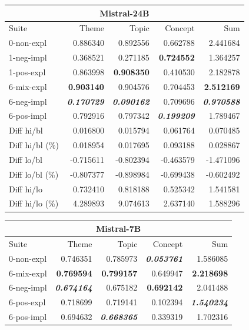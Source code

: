 \begin{table}
    \begin{tabular}{lrrrr}
    \toprule
    \multicolumn{5}{c}{\textbf{Mistral-24B}} \\
    \midrule
    Suite & Theme & Topic & Concept & Sum \\
    \midrule
    0-non-expl & 0.886340 & 0.892556 & 0.662788 & 2.441684 \\
    1-neg-impl & 0.368521 & 0.271185 & \bfseries 0.724552 & 1.364257 \\
    1-pos-expl & 0.863998 & \bfseries 0.908350 & 0.410530 & 2.182878 \\
    6-mix-expl & \bfseries 0.903140 & 0.904576 & 0.704453 & \bfseries 2.512169 \\
    6-neg-impl & \bfseries \itshape 0.170729 & \bfseries \itshape 0.090162 & 0.709696 & \bfseries \itshape 0.970588 \\
    6-pos-impl & 0.792916 & 0.797342 & \bfseries \itshape 0.199209 & 1.789467 \\
    \midrule
    Diff hi/bl & 0.016800 & 0.015794 & 0.061764 & 0.070485 \\
    Diff hi/bl (\%) & 0.018954 & 0.017695 & 0.093188 & 0.028867 \\
    \midrule
    Diff lo/bl & -0.715611 & -0.802394 & -0.463579 & -1.471096 \\
    Diff lo/bl (\%) & -0.807377 & -0.898984 & -0.699438 & -0.602492 \\
    \midrule
    Diff hi/lo & 0.732410 & 0.818188 & 0.525342 & 1.541581 \\
    Diff hi/lo (\%) & 4.289893 & 9.074613 & 2.637140 & 1.588296 \\
    \bottomrule
    \end{tabular}
    \begin{tabular}{lrrrr}
    \toprule
    \multicolumn{5}{c}{\textbf{Mistral-7B}} \\
    \midrule
    Suite & Theme & Topic & Concept & Sum \\
    \midrule
    0-non-expl & 0.746351 & 0.785973 & \bfseries \itshape 0.053761 & 1.586085 \\
    6-mix-expl & \bfseries 0.769594 & \bfseries 0.799157 & 0.649947 & \bfseries 2.218698 \\
    6-neg-impl & \bfseries \itshape 0.674164 & 0.675182 & \bfseries 0.692142 & 2.041488 \\
    6-pos-expl & 0.718699 & 0.719141 & 0.102394 & \bfseries \itshape 1.540234 \\
    6-pos-impl & 0.694632 & \bfseries \itshape 0.668365 & 0.339319 & 1.702316 \\

\end{tabular}
\end{table}
